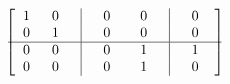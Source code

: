 \begin{example}
	\begin{equation}
		\begin{bmatrix}
			\hspace{2mm} 1 & \hspace{2mm} 0 \hspace{2mm} & \vline & \hspace{2mm} 0 \hspace{2mm} & \hspace{2mm} 0 \hspace{2mm} & \vline & \hspace{2mm} 0 \hspace{4mm} \\
			\hspace{2mm} 0 & \hspace{2mm} 1 \hspace{2mm} & \vline & \hspace{2mm} 0 \hspace{2mm} & \hspace{2mm} 0 \hspace{2mm} & \vline & \hspace{2mm} 0 \hspace{4mm} \\
			\hline
			\hspace{2mm} 0 & \hspace{2mm} 0 \hspace{2mm} & \vline & \hspace{2mm} 0 \hspace{2mm} & \hspace{2mm} 1 \hspace{2mm} & \vline & \hspace{2mm} 1 \hspace{4mm} \\
			\hspace{2mm} 0 & \hspace{2mm} 0 \hspace{2mm} & \vline & \hspace{2mm} 0 \hspace{2mm} & \hspace{2mm} 1 \hspace{2mm} & \vline & \hspace{2mm} 0 \hspace{4mm} \\
			
		\end{bmatrix}
	\end{equation}
	
	
\end{example}